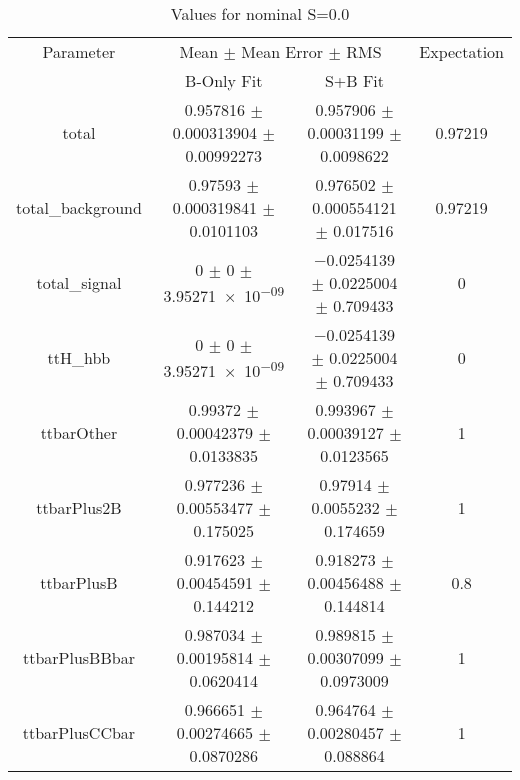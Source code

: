 \begin{table}
\centering
\caption{Values for nominal S=0.0}
\begin{tabular}{cccc}
\toprule
Parameter & \multicolumn{2}{c}{Mean $\pm$ Mean Error $\pm$ RMS} & Expectation\\
 & B-Only Fit & S+B Fit & \\
\midrule
total & \num{0.957816} $\pm$ \num{0.000313904} $\pm$ \num{0.00992273} & \num{0.957906} $\pm$ \num{0.00031199} $\pm$ \num{0.0098622} & \num{0.97219}\\
total\_background & \num{0.97593} $\pm$ \num{0.000319841} $\pm$ \num{0.0101103} & \num{0.976502} $\pm$ \num{0.000554121} $\pm$ \num{0.017516} & \num{0.97219}\\
total\_signal & \num{0} $\pm$ \num{0} $\pm$ \num{3.95271e-09} & \num{-0.0254139} $\pm$ \num{0.0225004} $\pm$ \num{0.709433} & \num{0}\\
ttH\_hbb & \num{0} $\pm$ \num{0} $\pm$ \num{3.95271e-09} & \num{-0.0254139} $\pm$ \num{0.0225004} $\pm$ \num{0.709433} & \num{0}\\
ttbarOther & \num{0.99372} $\pm$ \num{0.00042379} $\pm$ \num{0.0133835} & \num{0.993967} $\pm$ \num{0.00039127} $\pm$ \num{0.0123565} & \num{1}\\
ttbarPlus2B & \num{0.977236} $\pm$ \num{0.00553477} $\pm$ \num{0.175025} & \num{0.97914} $\pm$ \num{0.0055232} $\pm$ \num{0.174659} & \num{1}\\
ttbarPlusB & \num{0.917623} $\pm$ \num{0.00454591} $\pm$ \num{0.144212} & \num{0.918273} $\pm$ \num{0.00456488} $\pm$ \num{0.144814} & \num{0.8}\\
ttbarPlusBBbar & \num{0.987034} $\pm$ \num{0.00195814} $\pm$ \num{0.0620414} & \num{0.989815} $\pm$ \num{0.00307099} $\pm$ \num{0.0973009} & \num{1}\\
ttbarPlusCCbar & \num{0.966651} $\pm$ \num{0.00274665} $\pm$ \num{0.0870286} & \num{0.964764} $\pm$ \num{0.00280457} $\pm$ \num{0.088864} & \num{1}\\
\bottomrule
\end{tabular}
\end{table}